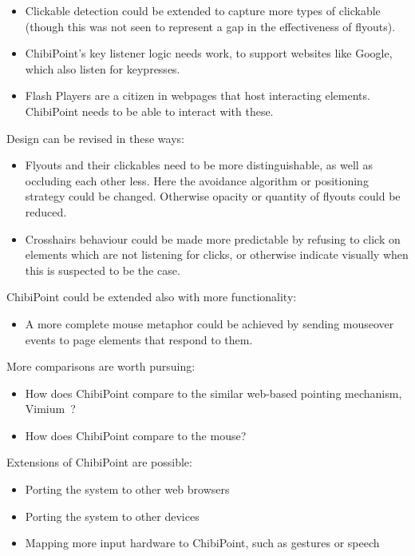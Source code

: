 \documentclass[11pt,openright,a4paper]{report}
\begin{document}
\begin{itemize}
\item Clickable detection could be extended to capture more types of clickable (though this was not 
seen to represent a gap in the effectiveness of flyouts).
\item ChibiPoint's key listener logic needs work, to support websites like Google, which also listen for keypresses.
\item Flash Players are a citizen in webpages that host interacting elements. ChibiPoint needs to be able to interact with these.
\end{itemize}

Design can be revised in these ways:
\begin{itemize}
\item Flyouts and their clickables need to be more distinguishable, as well as occluding each other less. Here the avoidance algorithm or positioning strategy could be changed. Otherwise opacity or quantity of flyouts could be reduced.
\item Crosshairs behaviour could be made more predictable by refusing to click on elements which are not listening for clicks, or otherwise indicate visually when this is suspected to be the case.
\end{itemize}

ChibiPoint could be extended also with more functionality:
\begin{itemize}
\item A more complete mouse metaphor could be achieved by sending mouseover events to page elements that respond to them.
\end{itemize}

More comparisons are worth pursuing:
\begin{itemize}
\item How does ChibiPoint compare to the similar web-based pointing mechanism, Vimium~\cite{vimium}?
\item How does ChibiPoint compare to the mouse?
\end{itemize}

Extensions of ChibiPoint are possible:
\begin{itemize}
\item Porting the system to other web browsers
\item Porting the system to other devices
\item Mapping more input hardware to ChibiPoint, such as gestures or speech
\end{itemize}
\end{document}
